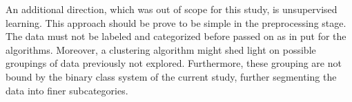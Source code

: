 		\par 
		
		An additional direction, which was out of scope for this study, is unsupervised learning. This approach should be prove to be simple in the preprocessing stage. The data must not be labeled and categorized before passed on as in put for the algorithms. Moreover, a clustering algorithm might shed light on possible groupings of data previously not explored. Furthermore, these grouping are not bound by the binary class system of the current study, further segmenting the data into finer subcategories.